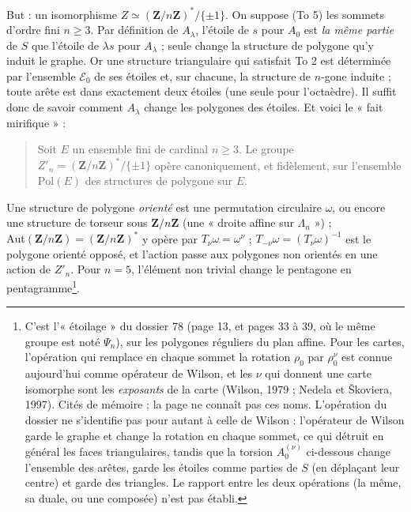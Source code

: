 \documentclass[11pt,a4paper]{article}
\begin{document}
But : un isomorphisme $Z \simeq (\mathbf{Z}/n\mathbf{Z})^{*}/\{\pm 1\}$. On
suppose (To 5) les sommets d'ordre fini $n \geq 3$. Par définition de
$A_\lambda$, l'étoile de $s$ pour $A_0$ est \emph{la même partie} de $S$ que
l'étoile de $\lambda s$ pour $A_\lambda$ ; seule change la structure de
polygone qu'y induit le graphe. Or une structure triangulaire qui satisfait
To 2 est déterminée par l'ensemble $\mathcal{E}_0$ de ses étoiles et, sur
chacune, la structure de $n$-gone induite ; toute arête est dans exactement
deux étoiles (une seule pour l'octaèdre). Il suffit donc de savoir comment
$A_\lambda$ change les polygones des étoiles. Et voici le « fait mirifique » :
\begin{quote}
  Soit $E$ un ensemble fini de cardinal $n \geq 3$. Le groupe $Z'_n =
  (\mathbf{Z}/n\mathbf{Z})^{*}/\{\pm 1\}$ opère canoniquement, et fidèlement,
  sur l'ensemble $\mathrm{Pol}(E)$ des structures de polygone sur $E$.
\end{quote}
Une structure de polygone \emph{orienté} est une permutation circulaire
$\omega$, ou encore une structure de torseur sous $\mathbf{Z}/n\mathbf{Z}$ (une
« droite affine sur $\Lambda_n$ ») ; $\mathrm{Aut}(\mathbf{Z}/n\mathbf{Z}) =
(\mathbf{Z}/n\mathbf{Z})^{*}$ y opère par $T_\nu \omega = \omega^\nu$ ;
$T_{-\nu}\omega = (T_\nu\omega)^{-1}$ est le polygone orienté opposé, et
l'action passe aux polygones non orientés en une action de $Z'_n$. Pour $n =
5$, l'élément non trivial change le pentagone en pentagramme\footnote{C'est
l'« étoilage » du dossier 78 (page 13, et pages 33 à 39, où le même groupe est
noté $\Psi_n$), sur les polygones réguliers du plan affine. Pour les cartes,
l'opération qui remplace en chaque sommet la rotation $\rho_0$ par
$\rho_0^\nu$ est connue aujourd'hui comme opérateur de Wilson, et les $\nu$ qui
donnent une carte isomorphe sont les \emph{exposants} de la carte (Wilson,
1979 ; Nedela et Škoviera, 1997). Cités de mémoire ; la page ne connaît pas
ces noms. L'opération du dossier ne s'identifie pas pour autant à celle de
Wilson : l'opérateur de Wilson garde le graphe et change la rotation en chaque
sommet, ce qui détruit en général les faces triangulaires, tandis que la
torsion $A_0^{(\nu)}$ ci-dessous change l'ensemble des arêtes, garde les
étoiles comme parties de $S$ (en déplaçant leur centre) et garde des
triangles. Le rapport entre les deux opérations (la même, sa duale, ou une
composée) n'est pas établi.}.
\end{document}
